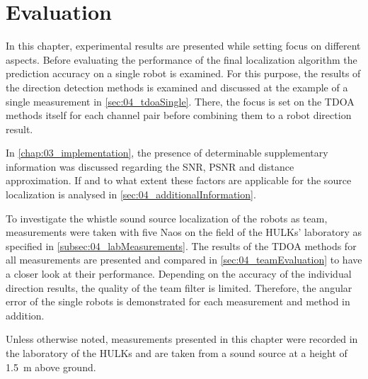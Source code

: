\chapter{Evaluation}


In this chapter, experimental results are presented while setting
focus on different aspects.
Before evaluating the performance of the final localization algorithm the prediction
accuracy on a single robot is examined.
For this purpose, the results of the direction detection methods is examined and
discussed at the example of a single measurement in \cref{sec:04_tdoaSingle}.
There, the focus is set on the \ac{TDOA} methods itself for each channel pair
before combining them to a robot direction result.

In \cref{chap:03_implementation}, the presence of determinable supplementary
information  was
discussed regarding the \ac{SNR}, \ac{PSNR} and distance approximation. If and to
what extent these factors are applicable for the source localization is analysed in
\cref{sec:04_additionalInformation}.

To investigate the whistle sound source localization of the robots as team,
measurements were taken with five Naos on the field of the HULKs' laboratory
as specified in \cref{subsec:04_labMeasurements}.
The results of the \ac{TDOA} methods for all measurements are presented and
compared in \cref{sec:04_teamEvaluation} to have a closer look at their
performance.
Depending on the accuracy of the individual direction results, the quality
of the team filter is limited.
Therefore, the angular error of the single robots is demonstrated for each
measurement and method in addition.

Unless otherwise noted, measurements presented in this chapter were recorded in the
laboratory of the HULKs and are taken from a sound source at a height of
\SI{1.5}{\meter} above ground.






